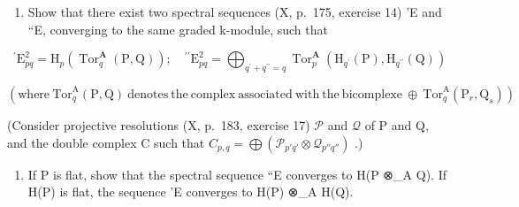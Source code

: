 \begin{enumerate}
\def\labelenumi{\alph{enumi})}
\tightlist
\item
  Show that there exist two spectral sequences (X, p.~175, exercise 14) 'E and ``E, converging to the same graded k-module, such that
\end{enumerate}

\[
^ {\prime} \mathrm{E} _ {p q} ^ {2} = \mathrm{H} _ {p} (\operatorname{Tor} _ {q} ^ {\mathbf {A}} (\mathrm{P}, \mathrm{Q})); \quad^ {\prime \prime} \mathrm{E} _ {p q} ^ {2} = \bigoplus_ {q ^ {\prime} + q ^ {\prime \prime} = q} \operatorname{Tor} _ {p} ^ {\mathbf {A}} \left(\mathrm{H} _ {q ^ {\prime}} (\mathrm{P}), \mathrm{H} _ {q ^ {\prime \prime}} (\mathrm{Q})\right)
\]

\((\mathrm{where}\ \mathrm{Tor}_{q}^{\mathrm{A}}(\mathrm{P},\mathrm{Q})\ \mathrm{denotes}\ \mathrm{the}\ \mathrm{complex}\ \mathrm{associated}\ \mathrm{with}\ \mathrm{the}\ \mathrm{bicomplexe}\ \oplus\ \mathrm{Tor}_{q}^{\mathrm{A}}(\mathrm{P}_{r},\mathrm{Q}_{s}))\)

(Consider projective resolutions (X, p.~183, exercise 17) \(\mathcal{P}\) and \(\mathcal{Q}\) of P and Q, and the double complex C such that \(C_{p,q} = \bigoplus (\mathcal{P}_{p'q'} \otimes \mathcal{Q}_{p''q''})\) .)

\begin{enumerate}
\def\labelenumi{\alph{enumi})}
\setcounter{enumi}{1}
\tightlist
\item
  If P is flat, show that the spectral sequence ``E converges to H(P ⊗\_A Q). If H(P) is flat, the sequence 'E converges to H(P) ⊗\_A H(Q).
\end{enumerate}

